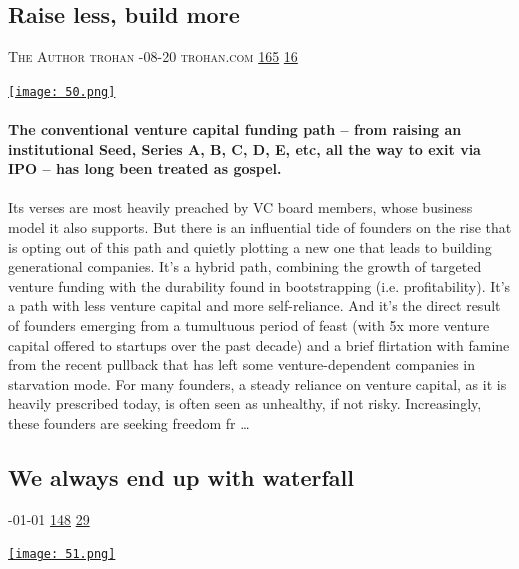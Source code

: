 \documentclass[10pt,a4paper]{article}
\begin{document}
\begin{multicols}{2}
\begin{minipage}{\linewidth}
\subsection{Raise less, build more}
\textsc{\footnotesize
{\scriptsize\faUser}\space 
The Author trohan 
{\scriptsize\faCalendar}-08-20 
{\scriptsize\faGlobe}\space 
trohan.com 
{\scriptsize\faThumbsOUp}\space 
\href{http://news.ycombinator.com/item?id=37298665\&utm\_term=comment}{165} 
{\scriptsize\faComments}\space 
\href{http://news.ycombinator.com/item?id=37298665\&utm\_term=comment}{16} 
}
\par\medskip\noindent
\href{https://trohan.com/2023/08/20/raise-less-build-more/?utm\_source=hackernewsletter\&utm\_medium=email\&utm\_term=working}{
    \texttt{[image: 50.png]}
}
\end{minipage}
\paragraph{}
\textbf{The conventional venture capital funding path – from raising an institutional Seed, Series A, B, C, D, E, etc, all the way to exit via IPO – has long been treated as gospel.}
\paragraph{}
 Its verses are most heavily preached by VC board members, whose business model it also supports.
But there is an influential tide of founders on the rise that is opting out of this path and quietly plotting a new one that leads to building generational companies.
It’s a hybrid path, combining the growth of targeted venture funding with the durability found in bootstrapping (i.e. profitability). It’s a path with less venture capital and more self-reliance.
And it’s the direct result of founders emerging from a tumultuous period of feast (with 5x more venture capital offered to startups over the past decade) and a brief flirtation with famine from the recent pullback that has left some venture-dependent companies in starvation mode.
For many founders, a steady reliance on venture capital, as it is heavily prescribed today, is often seen as unhealthy, if not risky.
Increasingly, these founders are seeking freedom fr
\dots\par
\noindent\begin{minipage}{\linewidth}
\medskip
\subsection{We always end up with waterfall}
\textsc{\footnotesize
{\scriptsize\faCalendar}-01-01 
{\scriptsize\faThumbsOUp}\space 
\href{http://news.ycombinator.com/item?id=37305698\&utm\_term=comment}{148} 
{\scriptsize\faComments}\space 
\href{http://news.ycombinator.com/item?id=37305698\&utm\_term=comment}{29} 
}
\par\medskip\noindent
\href{https://www.amazingcto.com/why-we-always-endup-with-waterfall-even-scrum/?utm\_source=hackernewsletter\&utm\_medium=email\&utm\_term=working}{
    \texttt{[image: 51.png]}
}
\end{minipage}

\end{multicols}
\end{document}
